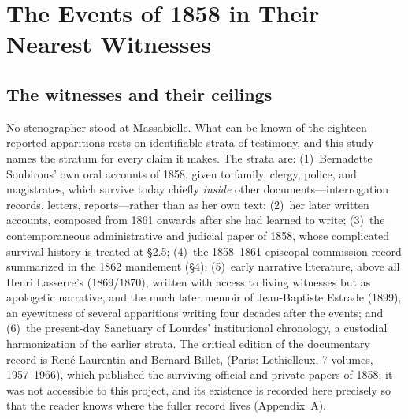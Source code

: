 \section{The Events of 1858 in Their Nearest Witnesses}

\subsection{The witnesses and their ceilings}

No stenographer stood at Massabielle. What can be known of the
eighteen reported apparitions rests on identifiable strata of
testimony, and this study names the stratum for every claim it
makes. The strata are: (1)~Bernadette Soubirous' own oral accounts
of 1858, given to family, clergy, police, and magistrates, which
survive today chiefly \emph{inside} other documents---interrogation
records, letters, reports---rather than as her own text; (2)~her
later written accounts, composed from 1861 onwards after she had
learned to write; (3)~the contemporaneous administrative and
judicial paper of 1858, whose complicated survival history is
treated at \S2.5; (4)~the 1858--1861 episcopal commission record
summarized in the 1862 mandement (\S4); (5)~early narrative
literature, above all Henri Lasserre's 
(1869/1870), written with access to living witnesses but as
apologetic narrative, and the much later memoir of Jean-Baptiste
Estrade (1899), an eyewitness of several apparitions writing four
decades after the events; and (6)~the present-day Sanctuary of
Lourdes' institutional chronology, a custodial harmonization of the
earlier strata. The critical edition of the documentary record is
Ren\'e Laurentin and Bernard Billet,  (Paris: Lethielleux, 7 volumes, 1957--1966), which
published the surviving official and private papers of 1858; it was
not accessible to this project, and its existence is recorded here
precisely so that the reader knows where the fuller record lives
(Appendix~A).

